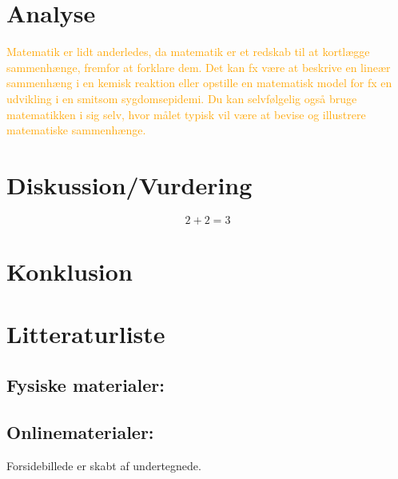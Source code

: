 \documentclass[12pt, a4paper]{article}
\begin{document}
\section{Analyse} %
\textcolor{orange}{Matematik er lidt anderledes, da matematik er et redskab til at kortlægge sammenhænge, fremfor at forklare dem. Det kan fx være at beskrive en lineær sammenhæng i en kemisk reaktion eller opstille en matematisk model for fx en udvikling i en smitsom sygdomsepidemi.  Du kan selvfølgelig også bruge matematikken i sig selv, hvor målet typisk vil være at bevise og illustrere matematiske sammenhænge.}
\section{Diskussion/Vurdering} %
\begin{equation}
    2+2=3
\end{equation}
\section{Konklusion} %

\section{Litteraturliste}
\nocite{*}
\subsection{Fysiske materialer:}
\printbibliography[keyword=bøger]
\subsection{Onlinematerialer:}
\printbibliography[keyword=online]
Forsidebillede er skabt af undertegnede.
\end{document}

